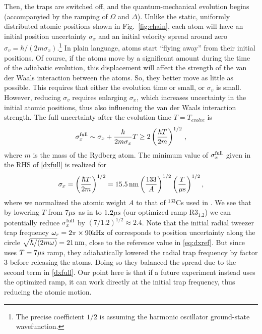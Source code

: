 \documentclass[a4paper,12pt]{article}
\newcommand{\beq}{\begin{equation}}
\newcommand{\eeq}{\end{equation}}
\theoremstyle{remark}
\theoremstyle{theorem}
\begin{document}
Then, the traps are switched off, and the quantum-mechanical evolution begins (accompanyied by the ramping of $\Omega$ and $\Delta$). Unlike the static, uniformly distributed atomic positions shown in Fig.~\ref{fig:chain}, each atom will have an initial position uncertainty $\sigma_x$ and an initial velocity spread around zero $\sigma_v= \hbar / (2m \sigma_x)$.\footnote{The precise coefficient $1/2$ is assuming the harmonic oscillator ground-state wavefunction.} In plain language, atoms start ``flying away'' from their initial positions. Of course, if the atoms move by a significant amount during the time of the adiabatic evolution, this displacement will affect the strength of the van der Waals interaction between the atoms. So, they better move as little as possible. This requires that either the evolution time or small, or $\sigma_v$ is small. However, reducing $\sigma_v$ requires enlarging $\sigma_x$, which increases uncertainty in the initial atomic positions, thus also influencing the van der Waals interaction strength. The full uncertainty after the evolution time $T=T_{evolve}$ is
\begin{equation}
	\sigma_x^{\rm full} \sim\sigma_x + \frac{\hbar}{2m \sigma_x } T \ge 2 \left(\frac {\hbar T}{2m}\right)^{1/2}\,,
	\label{dxfull}
\end{equation}
where $m$ is the mass of the Rydberg atom. The minimum value of $\sigma_x^{\rm full}$ given in the RHS of \eqref{dxfull} is realized for
\beq
\sigma_x = \left(\frac {\hbar T}{2m}\right)^{1/2}= 15.5\, {\rm nm} \left (\frac{133}{A}\right)^{1/2} \left (\frac T {\mu{\rm  s}}\right )^{1/2},
\label{eq:dxref}
\eeq
where we normalized the atomic weight $A$ to that of ${}^{133}$Cs used in \cite{Fang:2024uyf}. We see that by lowering $T$ from $7\mu {\rm s}$ as in \cite{Fang:2024uyf} to $1.2\mu {\rm s}$ (our optimized ramp R3$_{1.2}$) we can potentially reduce $\sigma_ x^{\rm full}$ by $(7/1.2)^{1/2}\approx 2.4$. Note that the initial radial tweezer trap frequency $\omega_r=2\pi\times 90 {\rm kHz}$ of \cite{Fang:2024uyf} corresponds to position uncertainty along the circle $\sqrt{\hbar/(2 m\omega)}=21\,{\rm nm}$, close to the reference value in \eqref{eq:dxref}. But since \cite{Fang:2024uyf} uses $T=7\mu{\rm s}$ ramp, they adiabatically lowered the radial trap frequency by factor 3 before releasing the atoms. Doing so they balanced the spread due to the second term in \eqref{dxfull}. Our point here is that if a future experiment instead uses the optimized ramp, it can work directly at the initial trap frequency, thus reducing the atomic motion.
\end{document}
